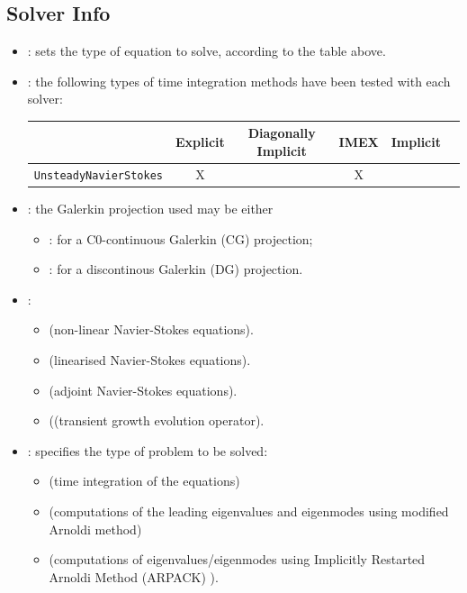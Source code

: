 \subsection{Solver Info}
\label{SectionIncNS_SolverInfo_Stab}

\begin{itemize}
\item {}:  sets the type of equation to solve, according to the
table above.
\item {}: the following types of time integration methods have been tested with each solver:
\begin{center}
\footnotesize
\begin{tabular}{lccccc}
\toprule
{} & {Explicit} &{Diagonally Implicit} &{IMEX} & {Implicit} \\
\midrule
\texttt{UnsteadyNavierStokes} & X & &X & \\
\bottomrule
\end{tabular}
\end{center}

\item {}: the Galerkin projection used may be either
\begin{itemize}
\item {}: for a C0-continuous Galerkin (CG) projection;
\item {}: for a discontinous Galerkin (DG) projection.
\end{itemize}

\item {}:
\begin{itemize}
\item {} (non-linear Navier-Stokes equations).
\item {} (linearised Navier-Stokes equations).
\item {} (adjoint Navier-Stokes equations).
\item {} ((transient growth evolution operator).
\end{itemize}

\item {}: specifies  the type of problem to be solved:
   \begin{itemize}
    \item {} (time integration of the equations)
    \item {} (computations of the leading eigenvalues and eigenmodes using modified Arnoldi method)
    \item {} (computations of eigenvalues/eigenmodes using Implicitly Restarted Arnoldi Method (ARPACK) ).
    \end{itemize}


\end{itemize}
